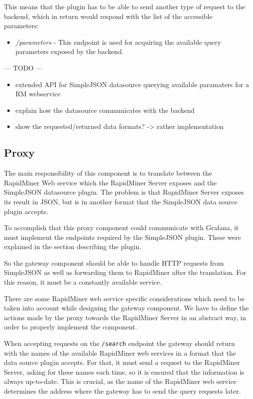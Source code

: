 This means that the plugin has to be able to send another type of request to the backend, which in return would respond with the list of the accessible parameters:

\begin{itemize}
	\item \emph{/parameters} - This endpoint is used for acquiring the available query parameters exposed by the backend.
\end{itemize}

\begin{center}
	--- TODO ---
	\begin{itemize}
		\item extended API for SimpleJSON datasource
		\subitem querying available paramaters for a RM webservice
		\item explain how the datasource communicates with the backend
		\item show the requested/returned data formats? -> rather implementation
	\end{itemize}
\end{center}


\subsection{Proxy}

The main responsibility of this component is to translate between the RapidMiner Web service which the RapidMiner Server exposes and the SimpleJSON datasource plugin. The problem is that RapidMiner Server exposes its result in JSON, but is in another format that the SimpleJSON data source plugin accepts.

To accomplish that this proxy component could communicate with Grafana, it must implement the endpoints required by the SimpleJSON plugin. These were explained in the section describing the plugin.

So the gateway component should be able to handle HTTP requests from SimpleJSON as well as forwarding them to RapidMiner after the translation. For this reason, it must be a constantly available service.

There are some RapidMiner web service specific considerations which need to be taken into account while designing the gateway component. We have to define the actions made by the proxy towards the RapidMiner Server in an abstract way, in order to properly implement the component.

When accepting requests on the \texttt{/search} endpoint the gateway should return with the names of the available RapidMiner web services in a format that the data source plugin accepts. For that, it must send a request to the RapidMiner Server, asking for these names each time, so it is ensured that the information is always up-to-date. This is crucial, as the name of the RapidMiner web service determines the address where the gateway has to send the query requests later.

